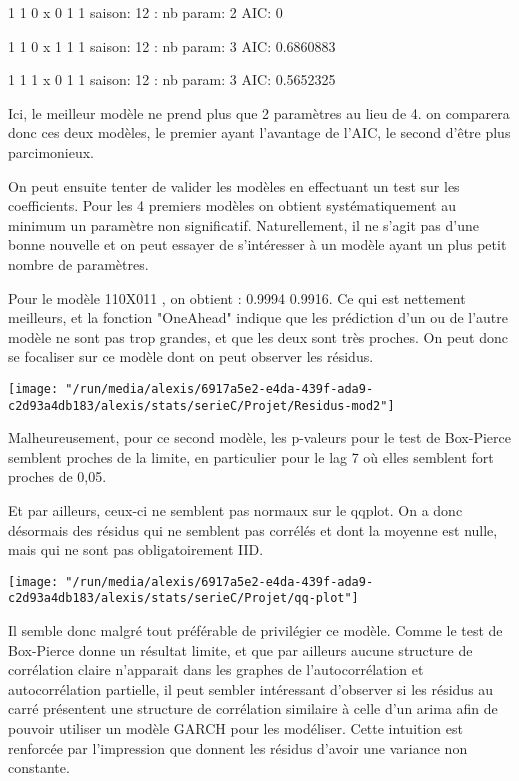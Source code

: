 \documentclass[11pt,a4paper]{article}
\begin{document}
1 1 0 x 0 1 1 saison: 12 :  nb param:  2 AIC: 0 

1 1 0 x 1 1 1 saison: 12 :  nb param:  3 AIC: 0.6860883 

1 1 1 x 0 1 1 saison: 12 :  nb param:  3 AIC: 0.5652325 
\bigskip

Ici, le meilleur modèle ne prend plus que 2 paramètres au lieu de 4. on comparera donc ces deux modèles, le premier ayant l'avantage de l'AIC, le second d'être plus parcimonieux.\bigskip
	
On peut ensuite tenter de valider les modèles  en effectuant un test sur les coefficients. Pour les 4 premiers modèles on obtient systématiquement au minimum un paramètre non significatif. Naturellement, il ne s'agit pas d'une bonne nouvelle et on peut essayer de s'intéresser à un modèle ayant un plus petit nombre de paramètres.\bigskip

Pour le modèle 110X011 , on obtient : 0.9994 0.9916. Ce qui est nettement meilleurs, et la fonction "OneAhead" indique que les prédiction d'un ou de l'autre modèle ne sont pas trop grandes, et que les deux sont très proches. On peut donc se focaliser sur ce modèle dont on peut observer les résidus.\bigskip
\begin{center}

\texttt{[image: "/run/media/alexis/6917a5e2-e4da-439f-ada9-c2d93a4db183/alexis/stats/serieC/Projet/Residus-mod2"]}

\end{center}
Malheureusement, pour ce second modèle, les p-valeurs pour le test de Box-Pierce semblent proches de la limite, en particulier pour le lag 7 où elles semblent fort proches de 0,05.\bigskip

Et par ailleurs, ceux-ci ne semblent pas normaux sur le qqplot. On a donc désormais des résidus qui ne semblent pas corrélés et dont la moyenne est nulle, mais qui ne sont pas obligatoirement IID.

\begin{center}
\texttt{[image: "/run/media/alexis/6917a5e2-e4da-439f-ada9-c2d93a4db183/alexis/stats/serieC/Projet/qq-plot"]}
\end{center}

Il semble donc malgré tout préférable de privilégier ce modèle. Comme le test de Box-Pierce donne un résultat limite, et que par ailleurs aucune structure de corrélation claire n'apparait dans les graphes de l'autocorrélation et autocorrélation partielle, il peut sembler intéressant d'observer si les résidus au carré présentent une structure de corrélation similaire à celle d'un arima afin de pouvoir utiliser un modèle GARCH pour les modéliser. Cette intuition est renforcée par l'impression que donnent les résidus d'avoir une variance non constante.\bigskip
\end{document}
